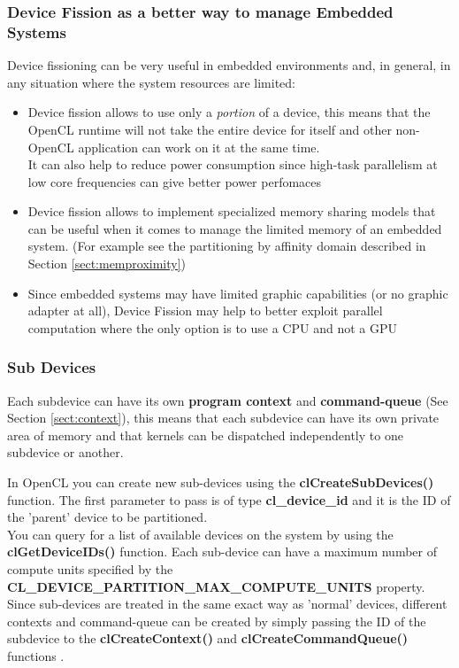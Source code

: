\subsubsection{Device Fission as a better way to manage Embedded Systems}
Device fissioning can be very useful in embedded environments and, in general, in any situation where the system resources are limited:

\begin{itemize}
	\item Device fission allows to use only a \emph{portion} of a device, this means that the OpenCL runtime will not take the entire device for itself and other non-OpenCL application can work on it at the same time.\\ It can also help to reduce power consumption since high-task parallelism at low core frequencies can give better power perfomaces \cite{leskela:mobileGPGPU}
	\item Device fission allows to implement specialized memory sharing models that can be useful when it comes to manage the limited memory of an embedded system. (For example see the partitioning by affinity domain described in Section \ref{sect:memproximity})
	\item Since embedded systems may have limited graphic capabilities (or no graphic adapter at all), Device Fission may help to better exploit parallel computation where the only option is to use a CPU and not a GPU
\end{itemize}

\subsubsection{Sub Devices} \label{sect:DF-subdevices}
Each subdevice can have its own \textbf{program context} and \textbf{command-queue} (See Section \ref{sect:context}), this means that each subdevice can have its own private area of memory and that kernels can be dispatched independently to one subdevice or another.\\

\begin{CLCode}
In OpenCL you can create new sub-devices using the \textbf{clCreateSubDevices()} function. The first parameter to pass is of type \textbf{cl\_device\_id} and it is the ID of the 'parent' device to be partitioned.\\ You can query for a list of available devices on the system by using the \textbf{clGetDeviceIDs()} function. Each sub-device can have a maximum number of compute units specified by the \textbf{CL\_DEVICE\_PARTITION\_MAX\_COMPUTE\_UNITS} property.
Since sub-devices are treated in the same exact way as 'normal' devices, different contexts and command-queue can be created by simply passing the ID of the subdevice to the \textbf{clCreateContext()} and \textbf{clCreateCommandQueue()} functions .
\label{Code:DevicePartitioning}
\end{CLCode}


